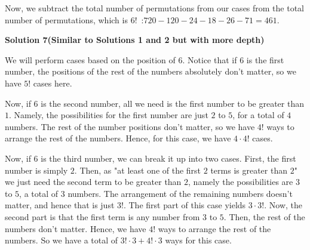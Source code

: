 \begin{enumerate}
 Now, we subtract the total number of permutations from our cases from the total number of permutations, which is $6!$ :$720 - 120 - 24 - 18 - 26 - 71 = \boxed{461}$.

 



\textbf{Solution 7(Similar to Solutions 1 and 2 but with more depth)}

We will perform cases based on the position of $6$. Notice that if $6$ is the first number, the positions of the rest of the numbers absolutely don't matter, so we have $5!$ cases here.

 Now, if $6$ is the second number, all we need is the first number to be greater than $1$. Namely, the possibilities for the first number are just $2$ to $5$, for a total of $4$ numbers. The rest of the number positions don't matter, so we have $4!$ ways to arrange the rest of the numbers. Hence, for this case, we have $4 \cdot 4!$ cases. 

 Now, if $6$ is the third number, we can break it up into two cases. First, the first number is simply $2$. Then, as "at least one of the first $2$ terms is greater than $2$" we just need the second term to be greater than $2$, namely the possibilities are $3$ to $5$, a total of $3$ numbers. The arrangement of the remaining numbers doesn't matter, and hence that is just $3!$. The first part of this case yields $3 \cdot 3!$. Now, the second part is that the first term is any number from $3$ to $5$. Then, the rest of the numbers don't matter. Hence, we have $4!$ ways to arrange the rest of the numbers. So we have a total of $3! \cdot 3 + 4! \cdot 3$ ways for this case. 


\end{enumerate}
